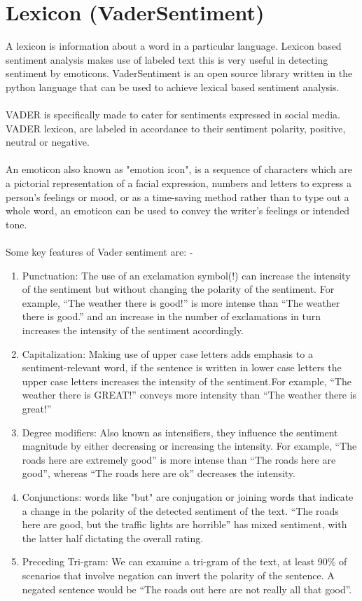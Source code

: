 \section{Lexicon (VaderSentiment)}
A lexicon is information about a word in a particular language. Lexicon based sentiment analysis makes use of labeled text this is very useful in detecting sentiment by emoticons. 
%
VaderSentiment is an open source library written in the python language that can be used to achieve lexical based sentiment analysis.\\ \\
VADER is specifically made to cater for sentiments expressed in social media.
VADER lexicon, are labeled in accordance to their sentiment polarity, positive, neutral or negative.
 \\ \\
An emoticon also known as "emotion icon", is a sequence of characters which are a pictorial representation of a facial expression, numbers and letters to express a person's feelings or mood, or as a time-saving method rather than to type out a whole word, an emoticon can be used to convey the writer's feelings or intended tone. \\ \\

Some key features of Vader sentiment are: -

\begin{enumerate}

\item
Punctuation: The use of an exclamation symbol(!) can increase the intensity of the sentiment but without changing the polarity of the sentiment. For example, “The weather there is good!” is more intense than “The weather there is good.” and an increase in the number of exclamations in turn increases the intensity of the sentiment accordingly.

\item
Capitalization: Making use of upper case letters adds emphasis to a sentiment-relevant word, if the sentence is written in lower case letters the upper case letters increases the intensity of the sentiment.For example, “The weather there is GREAT!” conveys more intensity than “The weather there is great!”
\item
Degree modifiers: Also known as intensifiers, they influence the sentiment magnitude  by either decreasing or increasing the intensity. For example, “The roads here are extremely good” is more intense than “The roads here are good”, whereas “The roads here are ok” decreases the intensity.
\item
Conjunctions: words like "but" are conjugation or joining words that indicate a change in the polarity of the detected sentiment of the text. “The roads here are good, but the traffic lights are horrible” has mixed sentiment, with the latter half dictating the overall rating.
\item
Preceding Tri-gram: We can examine a tri-gram of the text, at least 90\% of scenarios that involve negation can invert the polarity of the sentence. A negated sentence would be “The roads out here are not really all that good”.
\end{enumerate}

